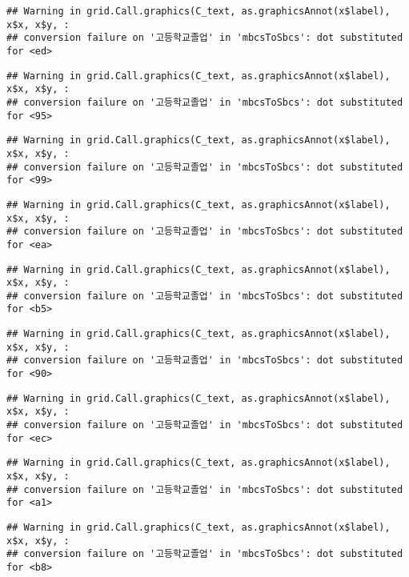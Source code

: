 \documentclass[
]{article}
\begin{document}
\begin{verbatim}
## Warning in grid.Call.graphics(C_text, as.graphicsAnnot(x$label), x$x, x$y, :
## conversion failure on '고등학교졸업' in 'mbcsToSbcs': dot substituted for <ed>
\end{verbatim}

\begin{verbatim}
## Warning in grid.Call.graphics(C_text, as.graphicsAnnot(x$label), x$x, x$y, :
## conversion failure on '고등학교졸업' in 'mbcsToSbcs': dot substituted for <95>
\end{verbatim}

\begin{verbatim}
## Warning in grid.Call.graphics(C_text, as.graphicsAnnot(x$label), x$x, x$y, :
## conversion failure on '고등학교졸업' in 'mbcsToSbcs': dot substituted for <99>
\end{verbatim}

\begin{verbatim}
## Warning in grid.Call.graphics(C_text, as.graphicsAnnot(x$label), x$x, x$y, :
## conversion failure on '고등학교졸업' in 'mbcsToSbcs': dot substituted for <ea>
\end{verbatim}

\begin{verbatim}
## Warning in grid.Call.graphics(C_text, as.graphicsAnnot(x$label), x$x, x$y, :
## conversion failure on '고등학교졸업' in 'mbcsToSbcs': dot substituted for <b5>
\end{verbatim}

\begin{verbatim}
## Warning in grid.Call.graphics(C_text, as.graphicsAnnot(x$label), x$x, x$y, :
## conversion failure on '고등학교졸업' in 'mbcsToSbcs': dot substituted for <90>
\end{verbatim}

\begin{verbatim}
## Warning in grid.Call.graphics(C_text, as.graphicsAnnot(x$label), x$x, x$y, :
## conversion failure on '고등학교졸업' in 'mbcsToSbcs': dot substituted for <ec>
\end{verbatim}

\begin{verbatim}
## Warning in grid.Call.graphics(C_text, as.graphicsAnnot(x$label), x$x, x$y, :
## conversion failure on '고등학교졸업' in 'mbcsToSbcs': dot substituted for <a1>
\end{verbatim}

\begin{verbatim}
## Warning in grid.Call.graphics(C_text, as.graphicsAnnot(x$label), x$x, x$y, :
## conversion failure on '고등학교졸업' in 'mbcsToSbcs': dot substituted for <b8>
\end{verbatim}
\end{document}
